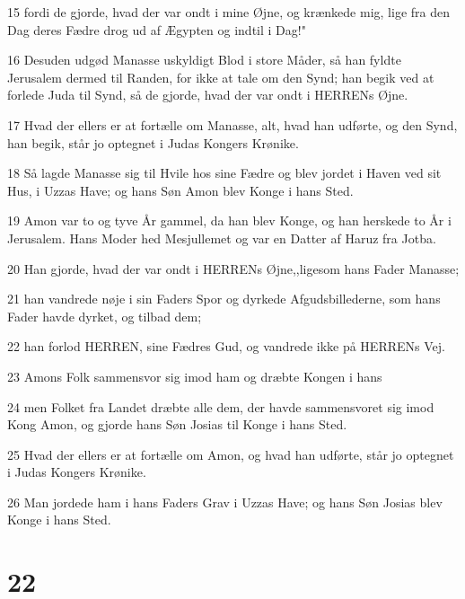 \par 15 fordi de gjorde, hvad der var ondt i mine Øjne, og krænkede mig, lige fra den Dag deres Fædre drog ud af Ægypten og indtil i Dag!"
\par 16 Desuden udgød Manasse uskyldigt Blod i store Måder, så han fyldte Jerusalem dermed til Randen, for ikke at tale om den Synd; han begik ved at forlede Juda til Synd, så de gjorde, hvad der var ondt i HERRENs Øjne.
\par 17 Hvad der ellers er at fortælle om Manasse, alt, hvad han udførte, og den Synd, han begik, står jo optegnet i Judas Kongers Krønike.
\par 18 Så lagde Manasse sig til Hvile hos sine Fædre og blev jordet i Haven ved sit Hus, i Uzzas Have; og hans Søn Amon blev Konge i hans Sted.
\par 19 Amon var to og tyve År gammel, da han blev Konge, og han herskede to År i Jerusalem. Hans Moder hed Mesjullemet og var en Datter af Haruz fra Jotba.
\par 20 Han gjorde, hvad der var ondt i HERRENs Øjne,,ligesom hans Fader Manasse;
\par 21 han vandrede nøje i sin Faders Spor og dyrkede Afgudsbillederne, som hans Fader havde dyrket, og tilbad dem;
\par 22 han forlod HERREN, sine Fædres Gud, og vandrede ikke på HERRENs Vej.
\par 23 Amons Folk sammensvor sig imod ham og dræbte Kongen i hans
\par 24 men Folket fra Landet dræbte alle dem, der havde sammensvoret sig imod Kong Amon, og gjorde hans Søn Josias til Konge i hans Sted.
\par 25 Hvad der ellers er at fortælle om Amon, og hvad han udførte, står jo optegnet i Judas Kongers Krønike.
\par 26 Man jordede ham i hans Faders Grav i Uzzas Have; og hans Søn Josias blev Konge i hans Sted.

\chapter{22}

